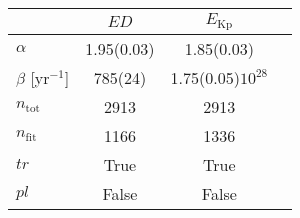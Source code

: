 \begin{tabular}{lccr}
\hline
  &        $ED$ &      $E_\mathrm{Kp}$ \\
\hline
$\alpha$            &  1.95(0.03) &           1.85(0.03) \\
$\beta$ [yr$^{-1}$] &     785(24) &  1.75(0.05)$10^{28}$ \\
$n_\mathrm{tot}$    &        2913 &                 2913 \\
$n_\mathrm{fit}$    &        1166 &                 1336 \\
$tr$                &        True &                 True \\
$pl$                &       False &                False \\
\hline

\end{tabular}
